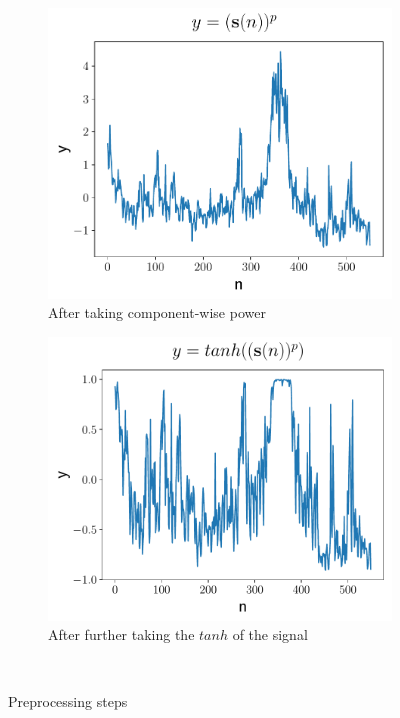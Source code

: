   \begin{figure}[h]
      \begin{subfigure}[h]{0.5\textwidth}
          \includegraphics[width=\textwidth]{./description/images/squeezed}
          \caption{ After taking component-wise power}
          \label{fig:squeezed}
      \end{subfigure}
      \begin{subfigure}[h]{0.5\textwidth}
          \includegraphics[width=\textwidth]{./description/images/tanh}
          \caption{After further taking the $tanh$ of the signal}
          \label{fig:tanh}
      \end{subfigure}\\
      
     
      \caption{Preprocessing steps}\label{fig:preprocessingSteps}
  \end{figure}
  
